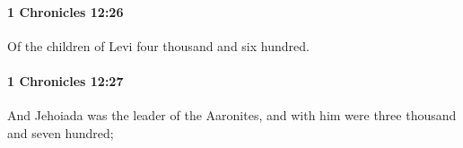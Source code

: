 		\paragraph{1 Chronicles 12:26} %
			\label{1CHRONICLES-12-26}

			Of the children of Levi four thousand and six hundred.


		\paragraph{1 Chronicles 12:27} %
			\label{1CHRONICLES-12-27}

			And Jehoiada was the leader of the Aaronites, and with him were three thousand and seven hundred;


